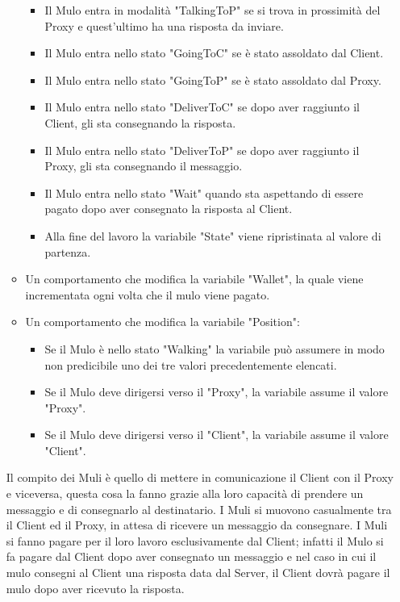 \documentclass[13pt,a4paper]{article}
\begin{document}
\begin{itemize}
\begin{itemize}
\begin{itemize}
				\item Il Mulo entra in modalità "TalkingToP" se si trova in prossimità del Proxy e quest'ultimo ha una risposta da inviare.
				\item Il Mulo entra nello stato "GoingToC" se è stato assoldato dal Client.
				\item Il Mulo entra nello stato "GoingToP" se è stato assoldato dal Proxy.
				\item Il Mulo entra nello stato "DeliverToC" se dopo aver raggiunto il Client, gli sta consegnando la risposta.
				\item Il Mulo entra nello stato "DeliverToP" se dopo aver raggiunto il Proxy, gli sta  consegnando il messaggio.
				\item Il Mulo entra nello stato "Wait" quando sta aspettando di essere pagato dopo aver consegnato la risposta al Client.
				\item Alla fine del lavoro la variabile "State" viene ripristinata al valore di partenza.
			\end{itemize}
			\item Un comportamento che modifica la variabile "Wallet", la quale viene incrementata ogni volta che il mulo viene pagato.
			\item Un comportamento che modifica la variabile "Position":
			\begin{itemize}
				\item Se il Mulo è nello stato "Walking" la variabile può assumere in modo non predicibile uno dei tre valori precedentemente elencati. 
				\item Se il Mulo deve dirigersi verso il "Proxy", la variabile assume il valore "Proxy".
				\item Se il Mulo deve dirigersi verso il "Client", la variabile assume il valore "Client".
			\end{itemize}
		\end{itemize}
		Il compito dei Muli è  quello di mettere in comunicazione il Client con il Proxy e viceversa, questa cosa la fanno grazie alla loro capacità di prendere un messaggio e di consegnarlo al destinatario. I Muli si muovono casualmente tra il Client ed il Proxy, in attesa di ricevere un messaggio da consegnare. I Muli si fanno pagare per il loro lavoro esclusivamente dal Client; infatti il Mulo si fa pagare dal Client dopo aver consegnato  un messaggio e nel caso in cui il mulo consegni al Client una risposta data dal Server, il Client dovrà pagare il mulo dopo aver ricevuto la risposta.
		

\end{itemize}
\end{document}
